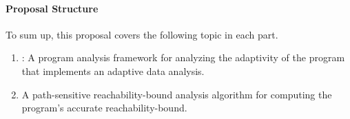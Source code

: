 \paragraph*{Proposal Structure}
To sum up, this proposal covers the following topic in each part.
\begin{enumerate}
 \item {}: A program analysis framework for analyzing the adaptivity of the program that implements an adaptive data analysis.
 \item {} A path-sensitive reachability-bound analysis algorithm for computing the program's accurate reachability-bound.
\end{enumerate}